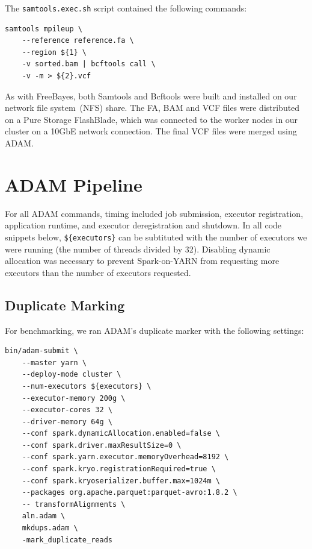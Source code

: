 \documentclass[phd]{ucbthesis}
\begin{document}
The \texttt{samtools.exec.sh} script contained the following commands:

\begin{lstlisting}[caption=Mpileup/Call Executor Script]
samtools mpileup \
    --reference reference.fa \
    --region ${1} \
    -v sorted.bam | bcftools call \
    -v -m > ${2}.vcf
\end{lstlisting}

As with FreeBayes, both Samtools and Bcftools were built and installed on our
network file system~(NFS) share. The
FA, BAM and VCF files were distributed on a Pure Storage FlashBlade, which was
connected to the worker nodes in our cluster on a 10GbE network connection. The
final VCF files were merged using ADAM.

\section{ADAM Pipeline}
\label{sec:adam}

For all ADAM commands, timing included job submission, executor registration,
application runtime, and executor deregistration and shutdown. In all code
snippets below, \texttt{\$\{executors\}} can be subtituted with the number of
executors we were running (the number of threads divided by 32). Disabling
dynamic allocation was necessary to prevent Spark-on-YARN from requesting
more executors than the number of executors requested.

\subsection{Duplicate Marking}
\label{sec:adam-md}

For benchmarking, we ran ADAM's duplicate marker with the following settings:

\begin{lstlisting}[caption=ADAM Duplicate Marking Command]
bin/adam-submit \
    --master yarn \
    --deploy-mode cluster \
    --num-executors ${executors} \
    --executor-memory 200g \
    --executor-cores 32 \
    --driver-memory 64g \
    --conf spark.dynamicAllocation.enabled=false \
    --conf spark.driver.maxResultSize=0 \
    --conf spark.yarn.executor.memoryOverhead=8192 \
    --conf spark.kryo.registrationRequired=true \
    --conf spark.kryoserializer.buffer.max=1024m \
    --packages org.apache.parquet:parquet-avro:1.8.2 \
    -- transformAlignments \
    aln.adam \
    mkdups.adam \
    -mark_duplicate_reads
\end{lstlisting}
\end{document}
